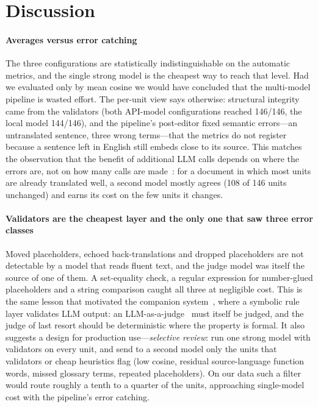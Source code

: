 \section{Discussion}
\label{sec:discussion}

\paragraph{Averages versus error catching}
The three configurations are statistically indistinguishable on the automatic metrics, and the single strong model is the cheapest way to reach that level. Had we evaluated only by mean cosine we would have concluded that the multi-model pipeline is wasted effort. The per-unit view says otherwise: structural integrity came from the validators (both API-model configurations reached 146/146, the local model 144/146), and the pipeline's post-editor fixed semantic errors---an untranslated sentence, three wrong terms---that the metrics do not register because a sentence left in English still embeds close to its source. This matches the observation that the benefit of additional LLM calls depends on where the errors are, not on how many calls are made~\cite{chen2024compound}: for a document in which most units are already translated well, a second model mostly agrees (108 of 146 units unchanged) and earns its cost on the few units it changes.

\paragraph{Validators are the cheapest layer and the only one that saw three error classes}
Moved placeholders, echoed back-translations and dropped placeholders are not detectable by a model that reads fluent text, and the judge model was itself the source of one of them. A set-equality check, a regular expression for number-glued placeholders and a string comparison caught all three at negligible cost. This is the same lesson that motivated the companion system~\cite{arya2026wizard}, where a symbolic rule layer validates LLM output: an LLM-as-a-judge~\cite{zheng2023judge} must itself be judged, and the judge of last resort should be deterministic where the property is formal. It also suggests a design for production use---\emph{selective review}: run one strong model with validators on every unit, and send to a second model only the units that validators or cheap heuristics flag (low cosine, residual source-language function words, missed glossary terms, repeated placeholders). On our data such a filter would route roughly a tenth to a quarter of the units, approaching single-model cost with the pipeline's error catching.

